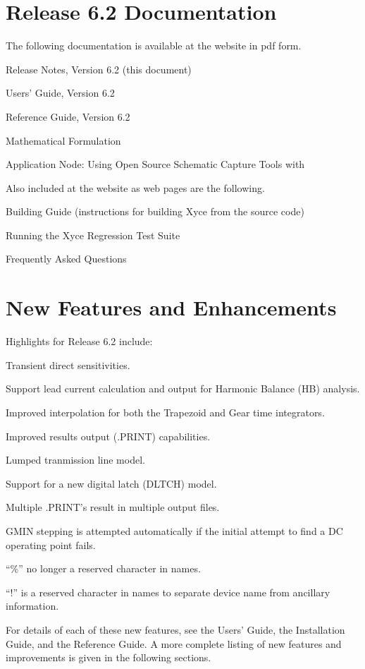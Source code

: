 \documentclass[11pt,report,strict]{SANDreport}
\begin{document}
\section{\Xyce{} Release 6.2 Documentation}
The following \Xyce{} documentation is available at the \Xyce{} website in pdf
form.
\begin{XyceItemize}
\item \Xyce{} Release Notes, Version 6.2 (this document)
\item \Xyce{} Users' Guide, Version 6.2
\item \Xyce{} Reference Guide, Version 6.2
\item \Xyce{} Mathematical Formulation
\item Application Node: Using Open Source Schematic Capture Tools with \Xyce{}
\end{XyceItemize}
Also included at the \Xyce{} website as web pages are the following.
\begin{XyceItemize}
\item Building Guide (instructions for building Xyce from the source code)
\item Running the Xyce Regression Test Suite
\item Frequently Asked Questions
\end{XyceItemize}

\section{New Features and Enhancements}

Highlights for \Xyce{} Release 6.2 include:
\begin{XyceItemize}
  \item Transient direct sensitivities.
  \item Support lead current calculation and output for Harmonic Balance (HB) analysis.
  \item Improved interpolation for both the Trapezoid and Gear
    time integrators.
  \item Improved results output (.PRINT) capabilities.
  \item Lumped tranmission line model.
  \item Support for a new digital latch (DLTCH) model.
  \item Multiple .PRINT's result in multiple output files.
  \item GMIN stepping is attempted automatically if the initial attempt to find
    a DC operating point fails.
  \item ``\%'' no longer a reserved character in names.
  \item ``!'' is a reserved character in names to separate device name from ancillary information.
\end{XyceItemize}
For details of each of these new features, see the \Xyce{} Users' Guide, the
\Xyce{} Installation Guide, and the \Xyce{} Reference Guide.  A more complete
listing of new features and improvements is given in the following sections.
\end{document}
